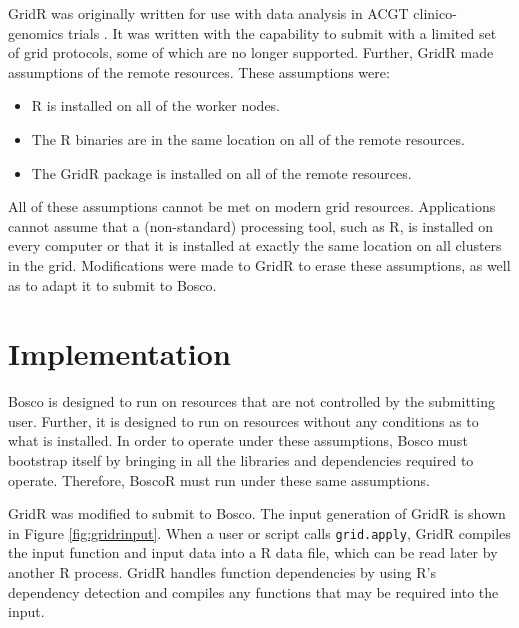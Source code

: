 \documentclass[conference]{IEEEtran}
\begin{document}
GridR was originally written for use with data analysis in ACGT clinico-genomics trials \cite{wegener2007gridr}.  It was written with the capability to submit with a limited set of grid protocols, some of which are no longer supported.  Further, GridR made assumptions of the remote resources.  These assumptions were:

\begin{itemize}
\item R is installed on all of the worker nodes.
\item The R binaries are in the same location on all of the remote resources.
\item The GridR package is installed on all of the remote resources.
\end{itemize}

All of these assumptions cannot be met on modern grid resources.  Applications cannot assume that a (non-standard) processing tool, such as R, is installed on every computer or   that it is installed at exactly the same location on all clusters in the grid.  Modifications were made to GridR to erase these assumptions, as well as to adapt it to submit to Bosco.

\section{Implementation}
\label{sec:implementation}


Bosco is designed to run on resources that are not controlled by the submitting user.  Further, it is designed to run on resources without any conditions as to what is installed.  In order to operate under these assumptions, Bosco must bootstrap itself by bringing in all the libraries and dependencies required to operate.  Therefore, BoscoR must run under these same assumptions.

GridR was modified to submit to Bosco.  The input generation of GridR is shown in Figure \ref{fig:gridrinput}.  When a user or script calls \texttt{grid.apply}, GridR compiles the input function and input data into a R data file, which can be read later by another R process.  GridR handles function dependencies by using R's dependency detection and compiles any functions that may be required into the input.  
\end{document}

